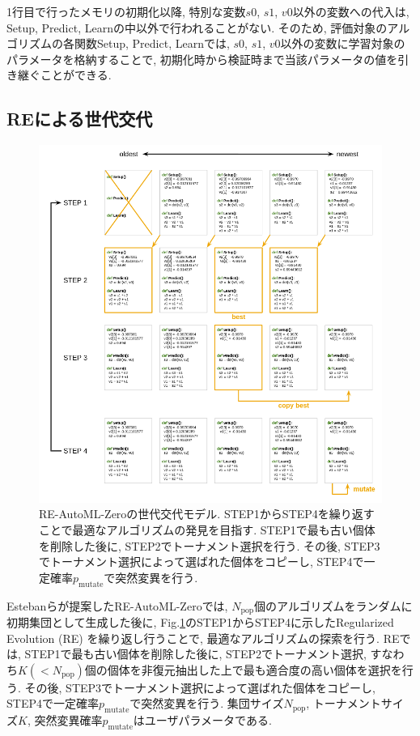 \documentclass[11pt,oneside,openany,report]{jsbook}
\begin{document}
\noindent
1行目で行ったメモリの初期化以降, 特別な変数$s0$, $s1$, $v0$以外の変数への代入は, Setup, Predict, Learnの中以外で行われることがない. そのため, 評価対象のアルゴリズムの各関数Setup, Predict, Learnでは, $s0$, $s1$, $v0$以外の変数に学習対象のパラメータを格納することで, 初期化時から検証時まで当該パラメータの値を引き継ぐことができる.

\subsection{REによる世代交代}\label{subsec:problem:existing_method:re}

\begin{figure}[tbp]
  \centering
  \includegraphics[width=14cm]{problem/existing_method/regularized_evolution.png}
  \caption{RE-AutoML-Zero\cite{automl_zero}の世代交代モデル. STEP1からSTEP4を繰り返すことで最適なアルゴリズムの発見を目指す. STEP1で最も古い個体を削除した後に, STEP2でトーナメント選択を行う. その後, STEP3でトーナメント選択によって選ばれた個体をコピーし, STEP4で一定確率$p_\mathrm{mutate}$で突然変異を行う. }
  \label{fig:regularized_evolution}
\end{figure}


Estebanらが提案したRE-AutoML-Zeroでは, $N_\mathrm{pop}$個のアルゴリズムをランダムに初期集団として生成した後に, Fig.\ref{fig:regularized_evolution}のSTEP1からSTEP4に示したRegularized Evolution (RE) を繰り返し行うことで, 最適なアルゴリズムの探索を行う. REでは, STEP1で最も古い個体を削除した後に, STEP2でトーナメント選択, すなわち$K( < N_\mathrm{pop})$個の個体を非復元抽出した上で最も適合度の高い個体を選択を行う. その後, STEP3でトーナメント選択によって選ばれた個体をコピーし, STEP4で一定確率$p_\mathrm{mutate}$で突然変異を行う. 集団サイズ$N_\mathrm{pop}$, トーナメントサイズ$K$, 突然変異確率$p_\mathrm{mutate}$はユーザパラメータである.
\end{document}
